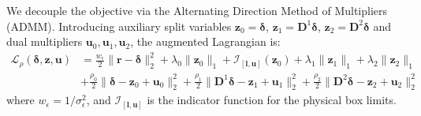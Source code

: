\documentclass[11pt,a4paper]{article}
\begin{document}
We decouple the objective via the Alternating Direction Method of Multipliers (ADMM). Introducing auxiliary split variables $\mathbf{z}_0 = \boldsymbol{\delta}$, $\mathbf{z}_1 = \mathbf{D}^1 \boldsymbol{\delta}$, $\mathbf{z}_2 = \mathbf{D}^2 \boldsymbol{\delta}$ and dual multipliers $\mathbf{u}_0, \mathbf{u}_1, \mathbf{u}_2$, the augmented Lagrangian is:
\begin{align}
\mathcal{L}_\rho(\boldsymbol{\delta}, \mathbf{z}, \mathbf{u}) &= \frac{w_\epsilon}{2} \|\mathbf{r} - \boldsymbol{\delta}\|_2^2 + \lambda_0 \|\mathbf{z}_0\|_1 + \mathcal{I}_{[\mathbf{l}, \mathbf{u}]}(\mathbf{z}_0) + \lambda_1 \|\mathbf{z}_1\|_1 + \lambda_2 \|\mathbf{z}_2\|_1 \nonumber \\
&+ \frac{\rho_0}{2} \|\boldsymbol{\delta} - \mathbf{z}_0 + \mathbf{u}_0\|_2^2 + \frac{\rho_1}{2} \|\mathbf{D}^1 \boldsymbol{\delta} - \mathbf{z}_1 + \mathbf{u}_1\|_2^2 + \frac{\rho_2}{2} \|\mathbf{D}^2 \boldsymbol{\delta} - \mathbf{z}_2 + \mathbf{u}_2\|_2^2
\end{align}
where $w_\epsilon = 1/\sigma_\epsilon^2$, and $\mathcal{I}_{[\mathbf{l}, \mathbf{u}]}$ is the indicator function for the physical box limits.
\end{document}
